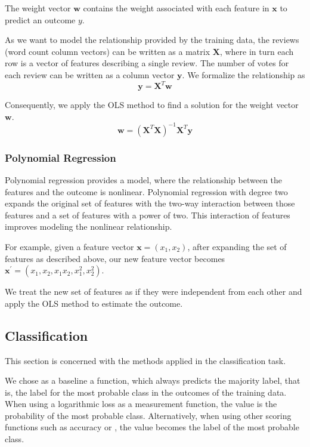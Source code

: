 The weight vector $\mathbf{w}$ contains the weight associated with each feature
in $\mathbf{x}$ to predict an outcome $y$.

As we want to model the relationship provided by the training data, the reviews
(word count column vectors) can be written as a matrix $\mathbf{X}$, where in
turn each row is a vector of features describing a single review.  The number of
votes for each review can be written as a column vector $\mathbf{y}$.  We
formalize the relationship as
\[
  \mathbf{y} = \mathbf{X}^T \mathbf{w}
\]

Consequently, we apply the OLS method to find a solution for the weight vector
$\mathbf{w}$.
\[
  \mathbf{w} = {(\mathbf{X}^T \mathbf{X})}^{-1} \mathbf{X}^T \mathbf{y}
\]

\subsubsection{Polynomial Regression}

Polynomial regression provides a model, where the relationship between the
features and the outcome is nonlinear.  Polynomial regression with degree two
expands the original set of features with the two-way interaction between those
features and a set of features with a power of two.  This interaction of
features improves modeling the nonlinear relationship.

For example, given a feature vector $\mathbf{x} = (x_1, x_2)$, after expanding
the set of features as described above, our new feature vector becomes
$\mathbf{x}^{'} = (x_1, x_2, x_1x_2, x_1^2, x_2^2)$.

We treat the new set of features as if they were independent from each other
and apply the OLS method to estimate the outcome.

\subsection{Classification}

This section is concerned with the methods applied in the classification task.

We chose as a baseline a function, which always predicts the majority label,
that is, the label for the most probable class in the outcomes of the training
data.  When using a logarithmic loss as a measurement function, the value is the
probability of the most probable class.  Alternatively, when using other scoring
functions such as accuracy or \fmeasure, the value becomes the label of the most
probable class.

